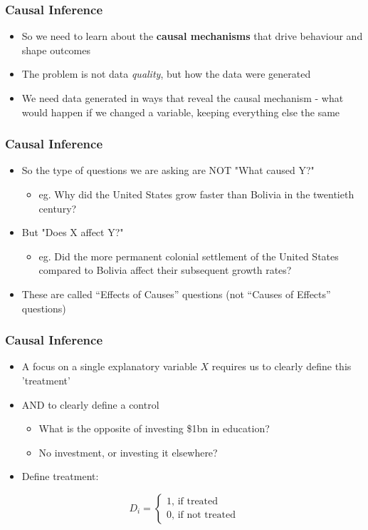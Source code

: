 \documentclass[xcolor=x11names,compress]{beamer}\usepackage[]{graphicx}\usepackage[]{color}
\renewcommand{\(}{\begin{columns}}
\renewcommand{\)}{\end{columns}}
\newcommand{\<}[1]{\begin{column}{#1}}
\renewcommand{\>}{\end{column}}
\begin{document}
\begin{frame}
\frametitle{Causal Inference}
\begin{itemize}
\item So we need to learn about the \textbf{causal mechanisms} that drive behaviour and shape outcomes
\item The problem is not data \textit{quality}, but how the data were generated
\item We need data generated in ways that reveal the causal mechanism - what would happen if we changed a variable, keeping everything else the same
\end{itemize}
\end{frame}




\begin{frame}
\frametitle{Causal Inference}
\begin{itemize}
\item So the type of questions we are asking are NOT "What caused Y?"
\begin{itemize}
\item eg. Why did the United States grow faster than Bolivia in the twentieth century?
\end{itemize}
\item But "Does X affect Y?"
\begin{itemize}
\item eg. Did the more permanent colonial settlement of the United States compared to Bolivia affect their subsequent growth rates? 
\end{itemize}
\item These are called ``Effects of Causes'' questions (not ``Causes of Effects'' questions)
\end{itemize}
\end{frame}

\begin{frame}
\frametitle{Causal Inference}
\begin{itemize}
\item A focus on a single explanatory variable $X$ requires us to clearly define this 'treatment' 
\item AND to clearly define a control
\begin{itemize}
\item What is the opposite of investing \$1bn in education?
\item No investment, or investing it elsewhere?
\end{itemize}
\item Define treatment:
\end{itemize}
\[D_i = 
\begin{cases}
1 \text{, if treated} \\
0 \text{, if not treated}
\end{cases}
\]
\end{frame}
\end{document}
